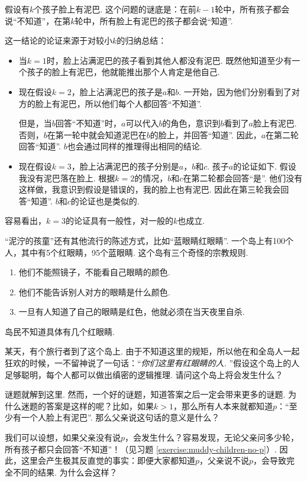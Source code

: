 假设有$k$个孩子脸上有泥巴. 这个问题的谜底是：在前$k-1$轮中，所有孩子都会说“不知道”，在第$k$轮中，所有脸上有泥巴的孩子都会说“知道”. 

这一结论的论证来源于对较小$k$的归纳总结：
\begin{itemize}
    \item 当$k=1$时，脸上沾满泥巴的孩子看到其他人都没有泥巴. 既然他知道至少有一个孩子的脸上有泥巴，他就能推出那个人肯定是他自己. 
    \item 现在假设$k=2$，脸上沾满泥巴的孩子是$a$和$b$. 一开始，因为他们分别看到了对方的脸上有泥巴，所以他们每个人都回答“不知道”. 
    
    但是，当$b$回答“不知道”时，$a$可以代入$b$的角色，意识到$b$看到了$a$脸上有泥巴. 否则，$b$在第一轮中就会知道泥巴在$b$的脸上，并回答“知道”. 因此，$a$在第二轮回答“知道”. $b$也会通过同样的推理得出相同的结论. 

    \item 现在假设$k=3$，脸上沾满泥巴的孩子分别是$a$，$b$和$c$. 孩子$a$的论证如下. 假设我没有泥巴落在脸上. 根据$k=2$的情况，$b$和$c$在第二轮都会回答“是”. 他们没有这样做，我意识到假设是错误的，我的脸上也有泥巴. 因此在第三轮我会回答“知道”. $b$和$c$的论证也是类似的.
\end{itemize}
容易看出，$k=3$的论证具有一般性，对一般的$k$也成立.

\begin{remark}
“泥泞的孩童”还有其他流行的陈述方式，比如“蓝眼睛红眼睛”. 一个岛上有100个人，其中有5个红眼睛，95个蓝眼睛. 这个岛有三个奇怪的宗教规则.
    \begin{enumerate}
        \item 他们不能照镜子，不能看自己眼睛的颜色. 
        \item 他们不能告诉别人对方的眼睛是什么颜色. 
        \item 一旦有人知道了自己的眼睛是红色，他就必须在当天夜里自杀.
    \end{enumerate}
岛民不知道具体有几个红眼睛. 

某天，有个旅行者到了这个岛上. 由于不知道这里的规矩，所以他在和全岛人一起狂欢的时候，一不留神说了一句话：“\textit{你们这里有红眼睛的人. }”假设这个岛上的人足够聪明，每个人都可以做出缜密的逻辑推理. 请问这个岛上将会发生什么？
\end{remark}

谜题就解到这里. 然而，一个好的谜题，知道答案之后一定会带来更多的谜题. 为什么迷题的答案是这样的呢？比如，如果$k>1$，那么所有人本来就都知道$p$：“至少有一个人脸上有泥巴”. 那么父亲说这句话的意义是什么？

我们可以设想，如果父亲没有说$p$，会发生什么？容易发现，无论父亲问多少轮，所有孩子都只会回答“不知道”！（见习题 \ref{exercise:muddy-children-no-p}）. 因此，这里会产生极其反直觉的事实：即便大家都知道$p$，父亲说不说$p$，会导致完全不同的结果. 为什么会这样？

